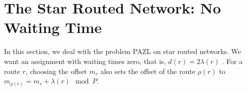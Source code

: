 \documentclass[10pt, conference, letterpaper]{IEEEtran}
\begin{document}
%
%  
%
%  
%
%
%  
%  
%  
%
%  
%
% 	
%       
%       


\section{The Star Routed Network: No Waiting Time} \label{sec:PAZL}
  
  
     In this section, we deal with the problem PAZL on star routed networks. We want an assignment with waiting times zero, that is, $d(r) = 2\lambda(r)$ . For a route $r$, choosing the offset $m_r$ also sets the offset of the route $\rho(r)$ to $m_{\rho(r)} = m_{r} + \lambda(r) \mod P$.
\end{document}
